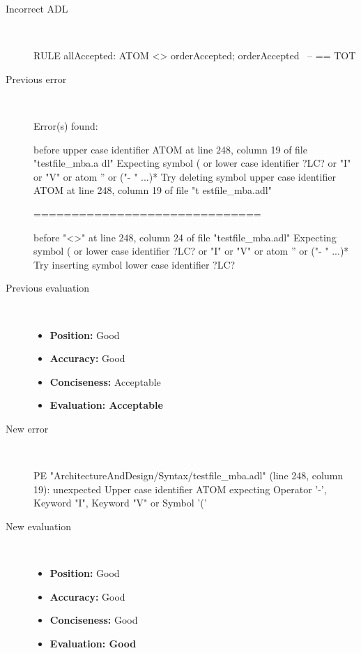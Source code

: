 \hrulefill

\begin{description}
  \item[Incorrect ADL]~\\
\begin{adl}
RULE allAccepted: ATOM <> orderAccepted; orderAccepted~ -- == TOT\end{adl}
  \item[Previous error]~\\
\begin{haskell}
Error(s) found:

before upper case identifier ATOM at line 248, column 19 of file "testfile_mba.a
dl"
Expecting symbol ( or lower case identifier ?LC? or "I" or "V" or atom '' or ("-
" ...)*
Try deleting symbol upper case identifier ATOM at line 248, column 19 of file "t
estfile_mba.adl"

==============================

before "<>" at line 248, column 24 of file "testfile_mba.adl"
Expecting symbol ( or lower case identifier ?LC? or "I" or "V" or atom '' or ("-
" ...)*
Try inserting symbol lower case identifier ?LC?
\end{haskell}
  \item[Previous evaluation]~\\
    \begin{itemize}
    \item \textbf{Position:} Good
    \item \textbf{Accuracy:} Good
    \item \textbf{Conciseness:} Acceptable
    \item \textbf{Evaluation: Acceptable}
    \end{itemize}
  \item[New error]~\\
\begin{haskell}
PE "ArchitectureAndDesign/Syntax/testfile_mba.adl" (line 248, column 19):
unexpected Upper case identifier ATOM
expecting Operator '-', Keyword "I", Keyword "V" or Symbol '('
\end{haskell}
  \item[New evaluation]~\\
    \begin{itemize}
    \item \textbf{Position:} Good
    \item \textbf{Accuracy:} Good
    \item \textbf{Conciseness:} Good
    \item \textbf{Evaluation: Good}
    \end{itemize}
  \end{description}

